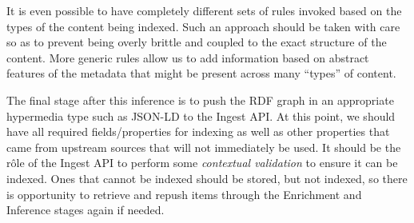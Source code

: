It is even possible to have
completely different sets of rules invoked based on the types of the content
being indexed. Such an approach should be taken with care so as to prevent
being overly brittle and coupled to the exact structure of the content. More
generic rules allow us to add information based on abstract features of the
metadata that might be present across many ``types'' of content.

The final stage after this inference is to push the RDF graph in
an appropriate hypermedia type such as JSON-LD to the Ingest API. At this
point, we should have all required fields/properties for indexing as
well as other properties that came from upstream sources that will not
immediately be used. It should be the r\^ole of the Ingest API to perform
some \emph{contextual validation}\cite{fowler2005contextual} to ensure
it can be indexed. Ones that cannot be indexed should be stored, but
not indexed, so there is opportunity to retrieve and repush items through
the Enrichment and Inference stages again if needed.
